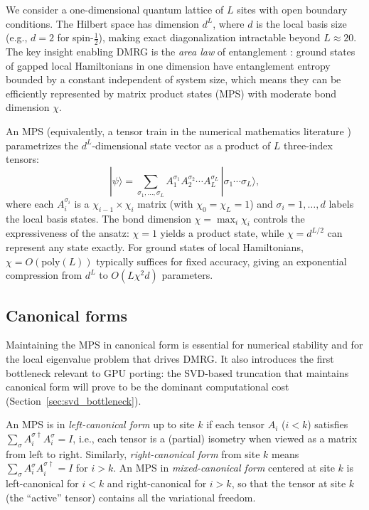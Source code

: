 \documentclass[preprint,12pt]{elsarticle}
\begin{document}
We consider a one-dimensional quantum lattice of $L$ sites with open boundary conditions.
The Hilbert space has dimension $d^L$, where $d$ is the local basis size (e.g., $d = 2$ for spin-$\frac{1}{2}$), making exact diagonalization intractable beyond $L \approx 20$.
The key insight enabling DMRG is the \emph{area law} of entanglement \cite{Eisert2010}: ground states of gapped local Hamiltonians in one dimension have entanglement entropy bounded by a constant independent of system size, which means they can be efficiently represented by matrix product states (MPS) with moderate bond dimension $\chi$.

An MPS (equivalently, a tensor train in the numerical mathematics literature \cite{Oseledets2011}) parametrizes the $d^L$-dimensional state vector as a product of $L$ three-index tensors:
\begin{equation}
  |\psi\rangle = \sum_{\sigma_1,\ldots,\sigma_L} A^{\sigma_1}_{1} A^{\sigma_2}_{2} \cdots A^{\sigma_L}_{L} \, |\sigma_1 \cdots \sigma_L\rangle,
\end{equation}
where each $A^{\sigma_i}_{i}$ is a $\chi_{i-1} \times \chi_i$ matrix (with $\chi_0 = \chi_L = 1$) and $\sigma_i = 1, \ldots, d$ labels the local basis states.
The bond dimension $\chi = \max_i \chi_i$ controls the expressiveness of the ansatz: $\chi = 1$ yields a product state, while $\chi = d^{L/2}$ can represent any state exactly.
For ground states of local Hamiltonians, $\chi = O(\text{poly}(L))$ typically suffices for fixed accuracy, giving an exponential compression from $d^L$ to $O(L \chi^2 d)$ parameters.

\subsection{Canonical forms}
\label{sec:canonical}

Maintaining the MPS in canonical form is essential for numerical stability and for the local eigenvalue problem that drives DMRG.
It also introduces the first bottleneck relevant to GPU porting: the SVD-based truncation that maintains canonical form will prove to be the dominant computational cost (Section~\ref{sec:svd_bottleneck}).

An MPS is in \emph{left-canonical form} up to site $k$ if each tensor $A_i$ ($i < k$) satisfies $\sum_\sigma A^{\sigma\dagger}_i A^\sigma_i = I$, i.e., each tensor is a (partial) isometry when viewed as a matrix from left to right.
Similarly, \emph{right-canonical form} from site $k$ means $\sum_\sigma A^\sigma_i A^{\sigma\dagger}_i = I$ for $i > k$.
An MPS in \emph{mixed-canonical form} centered at site $k$ is left-canonical for $i < k$ and right-canonical for $i > k$, so that the tensor at site $k$ (the ``active'' tensor) contains all the variational freedom.
\end{document}

